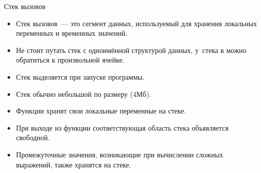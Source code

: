 \documentclass[aspectration=1610,t]{beamer}
\begin{document}
\begin{frame}[fragile]{Стек вызовов}
    \begin{itemize}
        \item Стек вызовов~— это сегмент данных, используемый для хранения локальных
            переменных и временных значений.

        \item Не стоит путать стек с одноимённой структурой данных, у~стека в \langcpp
            можно обратиться к произвольной ячейке.

        \item Стек выделяется при запуске программы.

        \item Стек обычно небольшой по размеру (4Мб).

        \item Функции хранят свои локальные переменные на стеке. 
        
        \item При выходе из функции соответствующая область стека
            объявляется свободной.

        \item Промежуточные значения, возникающие при вычислении
            сложных выражений, также хранятся на стеке.
    \end{itemize}
\end{frame}
\end{document}

